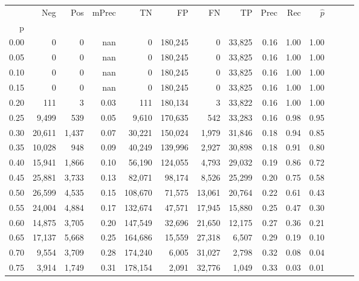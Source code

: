 \begin{tabular}{rrrrrrrrrrrrrr}
\toprule
{} &     Neg &    Pos & mPrec &       TN &       FP &      FN &      TP &  Prec &   Rec & $\hat{p}$ \\
p    &         &        &       &          &          &         &         &       &       &           \\
\midrule
0.00 &       0 &      0 &   nan &        0 &  180,245 &       0 &  33,825 &  0.16 &  1.00 &      1.00 \\
0.05 &       0 &      0 &   nan &        0 &  180,245 &       0 &  33,825 &  0.16 &  1.00 &      1.00 \\
0.10 &       0 &      0 &   nan &        0 &  180,245 &       0 &  33,825 &  0.16 &  1.00 &      1.00 \\
0.15 &       0 &      0 &   nan &        0 &  180,245 &       0 &  33,825 &  0.16 &  1.00 &      1.00 \\
0.20 &     111 &      3 &  0.03 &      111 &  180,134 &       3 &  33,822 &  0.16 &  1.00 &      1.00 \\
0.25 &   9,499 &    539 &  0.05 &    9,610 &  170,635 &     542 &  33,283 &  0.16 &  0.98 &      0.95 \\
0.30 &  20,611 &  1,437 &  0.07 &   30,221 &  150,024 &   1,979 &  31,846 &  0.18 &  0.94 &      0.85 \\
0.35 &  10,028 &    948 &  0.09 &   40,249 &  139,996 &   2,927 &  30,898 &  0.18 &  0.91 &      0.80 \\
0.40 &  15,941 &  1,866 &  0.10 &   56,190 &  124,055 &   4,793 &  29,032 &  0.19 &  0.86 &      0.72 \\
0.45 &  25,881 &  3,733 &  0.13 &   82,071 &   98,174 &   8,526 &  25,299 &  0.20 &  0.75 &      0.58 \\
0.50 &  26,599 &  4,535 &  0.15 &  108,670 &   71,575 &  13,061 &  20,764 &  0.22 &  0.61 &      0.43 \\
0.55 &  24,004 &  4,884 &  0.17 &  132,674 &   47,571 &  17,945 &  15,880 &  0.25 &  0.47 &      0.30 \\
0.60 &  14,875 &  3,705 &  0.20 &  147,549 &   32,696 &  21,650 &  12,175 &  0.27 &  0.36 &      0.21 \\
0.65 &  17,137 &  5,668 &  0.25 &  164,686 &   15,559 &  27,318 &   6,507 &  0.29 &  0.19 &      0.10 \\
0.70 &   9,554 &  3,709 &  0.28 &  174,240 &    6,005 &  31,027 &   2,798 &  0.32 &  0.08 &      0.04 \\
0.75 &   3,914 &  1,749 &  0.31 &  178,154 &    2,091 &  32,776 &   1,049 &  0.33 &  0.03 &      0.01 \\

\end{tabular}
